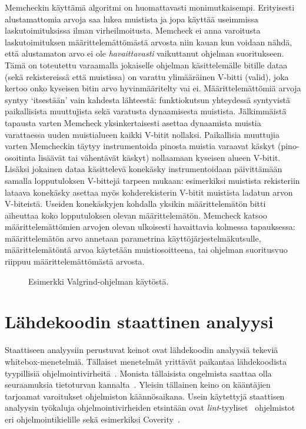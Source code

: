 Memcheckin käyttämä algoritmi on huomattavasti monimutkaisempi.
Erityisesti alustamattomia arvoja saa lukea muistista ja jopa käyttää useimmissa laskutoimituksissa ilman virheilmoitusta.
Memcheck ei anna varoitusta laskutoimituksen määrittelemättömästä arvosta niin kauan kun voidaan nähdä,
että alustamaton arvo ei ole \emph{havaittavasti} vaikuttanut ohjelman suoritukseen.
Tämä on toteutettu varaamalla jokaiselle ohjelman käsittelemälle bitille dataa (sekä rekistereissä että muistissa)
on varattu ylimääräinen V-bitti (valid),
joka kertoo onko kyseisen bitin arvo hyvinmääritelty vai ei.
Määrittelemättömiä arvoja syntyy `itsestään' vain kahdesta lähteestä:
funktiokutsun yhteydessä syntyvistä paikallisista muuttujista sekä varatusta dynaamisesta muistista.
Jälkimmäistä tapausta varten Memcheck yksinkertaisesti asettaa dynaamista muistia varattaessa uuden muistialueen kaikki V-bitit nollaksi.
Paikallisia muuttujia varten Memcheckin täytyy instrumentoida pinosta muistia varaavat käskyt (pino-osoitinta lisäävät tai vähentävät käskyt)
nollaamaan kyseisen alueen V-bitit.
Lisäksi jokainen dataa käsittelevä konekäsky instrumentoidaan päivittämään samalla lopputuloksen V-bittejä tarpeen mukaan:
esimerkiksi muistista rekisteriin lataava konekäsky asettaa myös kohderekisterin V-bitit muistista ladatun arvon V-biteistä.
Useiden konekäskyjen kohdalla yksikin määrittelemätön bitti aiheuttaa koko lopputuloksen olevan määrittelemätön.
Memcheck katsoo määrittelemättömien arvojen olevan ulkoisesti havaittavia kolmessa tapauksessa:
määrittelemätön arvo annetaan parametrina käyttöjärjestelmäkutsulle,
määrittelemätöntä arvoa käytetään muistiosoitteena,
tai ohjelman suoritusvuo riippuu määrittelemättömästä arvosta.

\begin{figure}



\caption{Esimerkki Valgrind-ohjelman käytöstä.}
\end{figure}

\section{Lähdekoodin staattinen analyysi}
\label{StaattinenAnalyysi}

Staattiseen analyysiin perustuvat keinot ovat lähdekoodin analyysiä tekeviä whitebox-menetelmiä.
Tällaiset menetelmät yrittävät paikantaa lähdekoodista tyypillisiä ohjelmointivirheitä~\cite[22.3]{Sommerville}.
Monista tällaisista ongelmista saattaa olla seuraamuksia tietoturvan kannalta~\cite{StaticCodeAnalysis}.
Yleisin tällainen keino on kääntäjien tarjoamat varoitukset ohjelmiston käännösaikana.
Usein käytettyjä staattisen analyysin työkaluja ohjelmointivirheiden etsintään
ovat \emph{lint}-tyyliset~\cite{Lint} ohjelmistot eri ohjelmointikielille sekä
esimerkiksi Coverity~\cite{Coverity}.

